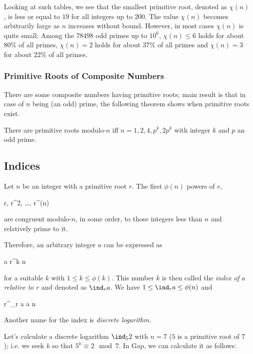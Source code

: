 Looking at such tables, we see that the smallest primitive root, denoted as $\chi(n)$, is less or equal to $19$ for all integers up to $200$. The value $\chi(n)$ becomes arbitrarily large as $n$ increases without bound. However, in most cases $\chi(n)$ is quite small: Among the $78498$ odd primes up to $10^6$, $\chi(n) \leq 6$ holds for about $80\%$ of all primes, $\chi(n) = 2$ holds for about $37\%$ of all primes and $\chi(n) = 3$ for about $22\%$ of all primes.

\subsubsection{Primitive Roots of Composite Numbers}

There are some composite numbers having primitive roots; main result is that in case of $n$ being (an odd) prime, the following theorem shows when primitive roots exist.

\begin{theorem}
  There are primitive roots modulo-$n$ iff $n=1,2,4, p^k, 2p^k$ with integer $k$ and $p$ an odd prime.
\end{theorem}



\subsection{Indices}

Let $n$ be an integer with a primitive root $r$. The first $\phi(n)$ powers of $r$,

\bee
r, r^2, \ldots, r^{\phi(n)}
\eee

are congruent modulo-$n$, in some order, to those integers less than $n$ and relatively prime to it. 


Therefore, an arbitrary integer $a$ can be expressed as

\bee
a \equiv r^k \mod n
\eee

for a suitable $k$ with $1 \leq k \leq \phi(k)$. This number $k$ is then called the \emph{index of $a$ relative to $r$} and denoted as $\ind_r a$. We have $1 \leq \ind_r a \leq \phi(n)$ and

\bee
r^{\ind_r a} \equiv a \mod n
\eee

Another name for the index is \emph{discrete logarithm}.

Let's calculate a discrete logarithm $\ind_5 2$ with $n=7$ ($5$ is a primitive root of $7$); i.e. we seek $k$ so that $5^k \equiv 2 \mod 7$. In Gap, we can calculate it as follows:

